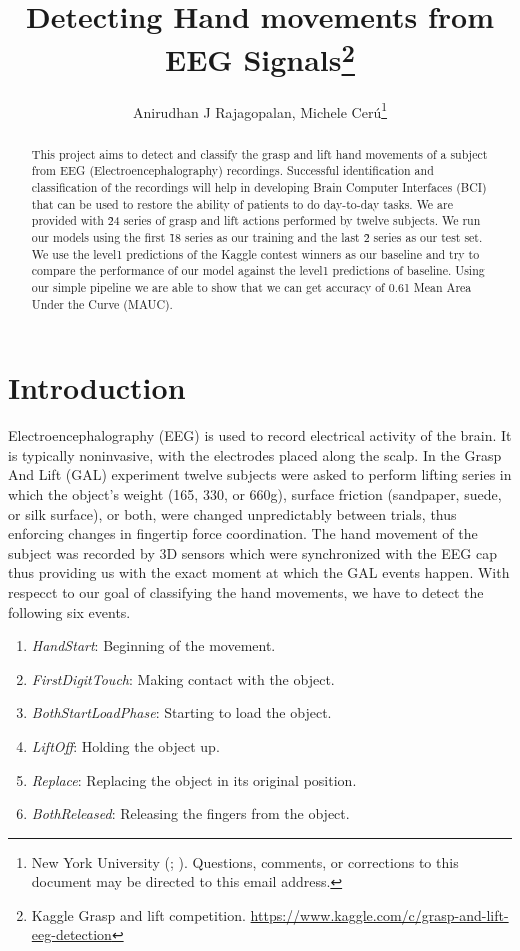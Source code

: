 \documentclass[final,leqno,onefignum,onetabnum]{siamltexmm}
\title{Detecting Hand movements from EEG Signals\thanks{Kaggle Grasp and lift competition. 
\url{https://www.kaggle.com/c/grasp-and-lift-eeg-detection}}}
\author{Anirudhan J Rajagopalan, Michele Cer\'u\thanks{New York University (\email{ajr619@nyu.edu}; \email{mc3784@nyu.edu}). Questions, comments, or corrections to this document may be directed to this email address.}}
\begin{document}
\maketitle

\begin{abstract}
  This project aims to detect and classify the grasp and lift hand movements of a subject from EEG (Electroencephalography) recordings.
  Successful identification and classification of the recordings will help in developing Brain Computer Interfaces (BCI) that can be used to restore the ability of patients to do day-to-day tasks.
  We are provided with \~24 series of grasp and lift actions performed by twelve subjects.  We run our models using the first \~18 series as our training and the last \~2 series as our test set.
  We use the level1 predictions of the Kaggle contest winners as our baseline and try to compare the performance of our model against the level1 predictions of baseline.
  Using our simple pipeline we are able to show that we can get accuracy of 0.61 Mean Area Under the Curve (MAUC)\@.
\end{abstract}

\section{Introduction}

Electroencephalography (EEG) is used to record electrical activity of the brain.
It is typically noninvasive, with the electrodes placed along the scalp.  
In the Grasp And Lift (GAL) experiment twelve subjects were asked to perform lifting series in which the object's weight (165, 330, or 660g), surface friction (sandpaper, suede, or silk surface), or both, were changed unpredictably between trials, thus enforcing changes in fingertip force coordination.\cite{naturegal}
The hand movement of the subject was recorded by 3D sensors which were synchronized with the EEG cap thus providing us with the exact moment at which the GAL events happen.  With respecct to our goal of classifying the hand movements, we have to detect the following six events.

\begin{enumerate} 
  \item \textit{HandStart}: Beginning of the movement.
  \item \textit{FirstDigitTouch}: Making contact with the object.  
  \item \textit{BothStartLoadPhase}: Starting to load the object. 
  \item \textit{LiftOff}: Holding the object up.
  \item \textit{Replace}: Replacing the object in its original position.
  \item \textit{BothReleased}: Releasing the fingers from the object. 
\end{enumerate}
\end{document}
